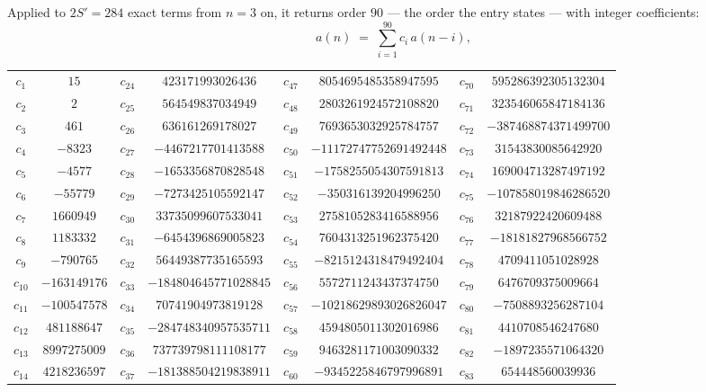 \documentclass[11pt,a4paper]{article}
\theoremstyle{plain}
\theoremstyle{definition}
\begin{document}
Applied to $2S'=284$ exact terms from $n=3$ on, it returns order $90$ --- the
order the entry states --- with integer coefficients:
\[
a(n)\;=\;\sum_{i=1}^{90}c_i\,a(n-i),
\]
\begin{center}\small
\begin{tabular}{cccccccc}
$c_{1}$ & $15$ & $c_{24}$ & $423171993026436$ & $c_{47}$ & $8054695485358947595$ & $c_{70}$ & $595286392305132304$ \\
$c_{2}$ & $2$ & $c_{25}$ & $564549837034949$ & $c_{48}$ & $2803261924572108820$ & $c_{71}$ & $323546065847184136$ \\
$c_{3}$ & $461$ & $c_{26}$ & $636161269178027$ & $c_{49}$ & $7693653032925784757$ & $c_{72}$ & $-387468874371499700$ \\
$c_{4}$ & $-8323$ & $c_{27}$ & $-4467217701413588$ & $c_{50}$ & $-11172747752691492448$ & $c_{73}$ & $31543830085642920$ \\
$c_{5}$ & $-4577$ & $c_{28}$ & $-1653356870828548$ & $c_{51}$ & $-1758255054307591813$ & $c_{74}$ & $169004713287497192$ \\
$c_{6}$ & $-55779$ & $c_{29}$ & $-7273425105592147$ & $c_{52}$ & $-350316139204996250$ & $c_{75}$ & $-107858019846286520$ \\
$c_{7}$ & $1660949$ & $c_{30}$ & $33735099607533041$ & $c_{53}$ & $2758105283416588956$ & $c_{76}$ & $32187922420609488$ \\
$c_{8}$ & $1183332$ & $c_{31}$ & $-6454396869005823$ & $c_{54}$ & $7604313251962375420$ & $c_{77}$ & $-18181827968566752$ \\
$c_{9}$ & $-790765$ & $c_{32}$ & $56449387735165593$ & $c_{55}$ & $-8215124318479492404$ & $c_{78}$ & $4709411051028928$ \\
$c_{10}$ & $-163149176$ & $c_{33}$ & $-184804645771028845$ & $c_{56}$ & $5572711243437374750$ & $c_{79}$ & $6476709375009664$ \\
$c_{11}$ & $-100547578$ & $c_{34}$ & $70741904973819128$ & $c_{57}$ & $-10218629893026826047$ & $c_{80}$ & $-7508893256287104$ \\
$c_{12}$ & $481188647$ & $c_{35}$ & $-284748340957535711$ & $c_{58}$ & $4594805011302016986$ & $c_{81}$ & $4410708546247680$ \\
$c_{13}$ & $8997275009$ & $c_{36}$ & $737739798111108177$ & $c_{59}$ & $9463281171003090332$ & $c_{82}$ & $-1897235571064320$ \\
$c_{14}$ & $4218236597$ & $c_{37}$ & $-181388504219838911$ & $c_{60}$ & $-9345225846797996891$ & $c_{83}$ & $654448560039936$ \\

\end{tabular}
\end{center}
\end{document}
